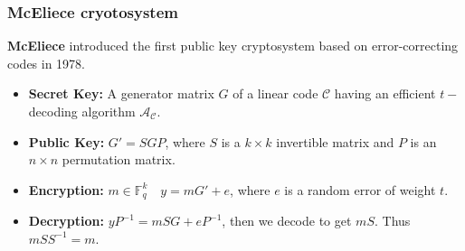 \documentclass[
10pt, %
%
aspectratio=169, %
]{beamer}
\theoremstyle{plain}%
\theoremstyle{definition}
\theoremstyle{remark}
\newcommand{\calA}{\mathcal{A}}
\newcommand{\calC}{\mathcal{C}}
\newcommand{\fq}{\mathbb{F}_{q}}
\begin{document}
	\begin{frame}
		
		\frametitle{McEliece cryotosystem}
		\textbf{McEliece} introduced the first public key cryptosystem based on error-correcting codes in 1978.
		
		\begin{itemize}
		 \item \textcolor{amaranth}{\textbf{Secret Key:}} A generator matrix $G$ of a linear code $\calC$ having an efficient $t-$decoding algorithm $\calA_{\calC}$.
		 \item \textcolor{amaranth}{\textbf{Public Key:}} $G'= SGP$, where $S$ is a $k\times k$ invertible matrix and $P$ is an $n\times n$ permutation matrix.
		 \item \textcolor{amaranth}{\textbf{Encryption:}} $m \in \fq^k\,\,$ \textrightarrow $\,\,y=mG'+ e$, where $e $ is a random error of weight $t$.
		 \item \textcolor{amaranth}{\textbf{Decryption:}} $yP^{-1}=mSG+eP^{-1}$, then we decode to get $mS$. Thus $mSS^{-1}=m$.
		\end{itemize}
		

\end{frame}
\end{document}
